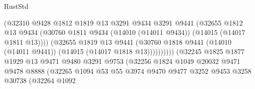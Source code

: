 \begin{lexlean}{RustStd}
\begin{coremodule}
                                        (@32310
                                          @9428
                                          @1812
                                          @1819
                                          @13
                                          @3291
                                          @9434
                                          @3291
                                          @9441
                                          (@32655
                                            @1812
                                            @13
                                            @9434
                                            (@30760
                                              @1811
                                              @9434
                                              (@14010 (@14011 @9434))
                                              (@14015 (@14017 @1811 @13))))
                                          (@32655
                                            @1819
                                            @13
                                            @9441
                                            (@30760
                                              @1818
                                              @9441
                                              (@14010 (@14011 @9441))
                                              (@14015 (@14017 @1818 @13))))))))))
                              (@32245
                                @1825
                                @1877
                                @1929
                                @13
                                @9471
                                @9480
                                @3291
                                @9753
                                (@32256
                                  @1824
                                  @1049
                                  @20032
                                  @9471
                                  @9478
                                  @8888
                                  (@32265
                                    @1094
                                    @53
                                    @55
                                    @3974
                                    @9470
                                    @9477
                                    @3252
                                    @9453
                                    @3258
                                    @30738
                                    (@32264
                                      @1092

\end{coremodule}
\end{lexlean}
